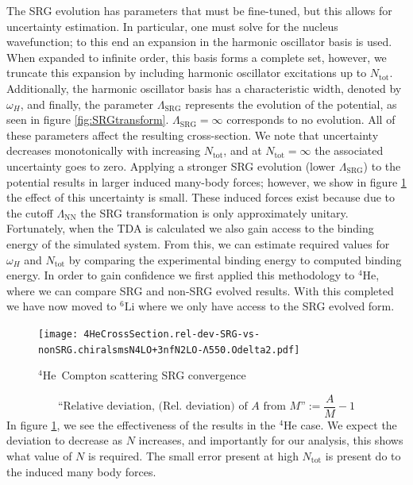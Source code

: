 \documentclass[12pt]{article}
\newcommand{\Ntot}{N_{\mathrm{tot}}}
\newcommand{\LamSRG}{\Lambda_{\mathrm{SRG}}}
\newcommand{\LamNN}{\Lambda_{\mathrm{NN}}}
\newcommand{\LiS}{{}^{6} \mathrm{Li} }
\newcommand{\HeF}{{}^{4} \mathrm{He}}
\newcommand{\3}{\ss}
\numberwithin{equation}{section}
\begin{document}
The SRG evolution has parameters that must be fine-tuned, but this
allows for uncertainty estimation.
In particular, one must solve for the nucleus wavefunction; 
to this end an expansion in the harmonic oscillator basis is used.
When expanded to infinite order, this basis forms a complete set,
however, we truncate this expansion by including harmonic oscillator excitations up to $\Ntot$.
Additionally, the harmonic oscillator basis has a characteristic
width, denoted by $\omega_H$, and finally, the parameter $\LamSRG$
represents the evolution of the potential, as seen in figure
\ref{fig:SRGtransform}. $\LamSRG=\infty$ corresponds to no evolution.
All of these parameters affect the resulting cross-section.
We note that uncertainty decreases monotonically with increasing
$\Ntot$, and at $\Ntot=\infty$ the associated uncertainty goes to zero.
Applying a stronger SRG evolution (lower $\LamSRG$) to the potential results in larger
induced many-body forces; however, we show in figure \ref{fig:SRGConverge4He} the
effect of this uncertainty is small.
These induced forces exist because due to the cutoff $\LamNN$ the SRG transformation
is only approximately unitary.
Fortunately, when the TDA is calculated we also gain access to the
binding energy of the simulated system.
From this, we can estimate required values for $\omega_H$ and
$\Ntot$ by comparing the experimental binding energy to computed
binding energy.
In order to gain confidence we first applied this methodology 
to $\HeF$, where we can compare SRG and non-SRG evolved results. 
With this completed we have now moved to $\LiS$ where we only have access to 
the SRG evolved form.
\begin{figure}[H]
  \begin{center}
    \texttt{[image: 
    4HeCrossSection.rel-dev-SRG-vs-nonSRG.chiralsmsN4LO+3nfN2LO-Λ550.Odelta2.pdf]}
    \caption{$\HeF$\, Compton scattering SRG convergence}
    \label{fig:SRGConverge4He}
  \end{center}
\end{figure}
\begin{equation}
  \text{``Relative deviation, (Rel. deviation) of $A$ from $M$''}:=
  \frac{A}{M}-1
\end{equation}
In figure \ref{fig:SRGConverge4He}, we see the effectiveness of the
results in the $\HeF$ case.
We expect the deviation to decrease as $N$ increases, and importantly
for our analysis, this shows what value of $N$ is required.
The small error present at high $\Ntot$ is present do to the induced many body forces.\\
\end{document}
